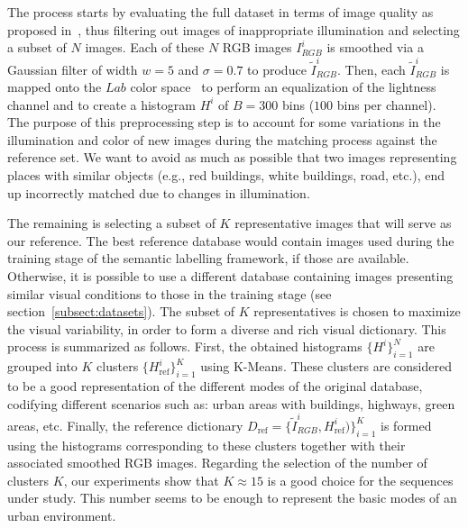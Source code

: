 
The process starts by evaluating the full dataset in terms of
image quality as proposed in~\cite{XueQualityCVPR2013}, thus
filtering out images of inappropriate illumination and selecting a
subset of $N$ images. Each of these $N$ RGB images $I^i_{RGB}$ is
smoothed via a Gaussian filter of width $w=5$ and $\sigma=0.7$ to
produce $\tilde{I}^i_{RGB}$. Then, each $\tilde{I}^i_{RGB}$ is mapped
onto the $Lab$ color space~\cite{Gonzalez:2002} to perform an
equalization of the lightness channel and to create a histogram
$H^i$ of $B=300$ bins ($100$ bins per channel). The purpose of
this preprocessing step is to account for some variations in the
illumination and color of new images during the matching
process against the reference set. We want to avoid as much as
possible that two images representing places with similar objects
(e.g., red buildings, white buildings, road, etc.), end up
incorrectly matched due to changes in illumination.

The remaining is selecting a subset of $K$ representative images
that will serve as our reference. The best reference database
would contain images used during the training stage of the
semantic labelling framework, if those are available. Otherwise,
it is possible to use a different database containing images
presenting similar visual conditions to those in the training
stage (see section~\ref{subsect:datasets}). The subset of $K$
representatives is chosen to maximize the visual variability, in
order to form a diverse and rich visual dictionary. This process
is summarized as follows. First, the obtained histograms
$\{H^i\}_{i=1}^N$ are grouped into $K$ clusters
$\{H_{\text{ref}}^i\}_{i=1}^K$ using K-Means. These clusters are
considered to be a good representation of the different modes of
the original database, codifying different scenarios such as:
urban areas with buildings, highways, green areas, etc. Finally,
the reference dictionary $D_\text{ref} = \{\tilde{I}^i_{RGB}, H^i_\text{ref})
\}_{i=1}^K$ is formed using the histograms corresponding to these
clusters together with their associated smoothed RGB images. Regarding the selection of the number of clusters $K$, our
experiments show that $K \approx 15$ is a good choice for the
sequences under study. This number seems to be enough to represent
the basic modes of an urban environment.



